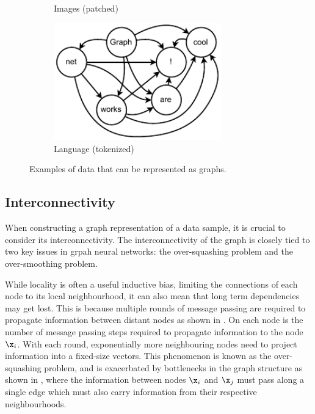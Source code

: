 \begin{figure}
\begin{subfigure}[b]{0.45\textwidth}
        \caption{Images (patched)}
        \label{fig:dog}
    \end{subfigure}
    \begin{subfigure}[b]{0.45\textwidth}
        \centering
        \includegraphics[width=0.8\textwidth]{Figures/transformers/text.pdf}
        \caption{Language (tokenized)}
        \label{fig:text}
    \end{subfigure}
    \caption{Examples of data that can be represented as graphs.}
    \label{fig:graph_examples}
\end{figure}

\subsection{Interconnectivity}

When constructing a graph representation of a data sample, it is crucial to consider its interconnectivity.
The interconnectivity of the graph is closely tied to two key issues in grpah neural networks: the over-squashing problem and the over-smoothing problem.

While locality is often a useful inductive bias, limiting the connections of each node to its local neighbourhood, it can also mean that long term dependencies may get lost.
This is because multiple rounds of message passing are required to propagate information between distant nodes as shown in .
On each node is the number of message passing steps required to propagate information to the node $\x_i$.
With each round, exponentially more neighbouring nodes need to project information into a fixed-size vectors.
This phenomenon is known as the over-squashing problem, and is exacerbated by bottlenecks in the graph structure as shown in , where the information between nodes $\x_i$ and $\x_j$ must pass along a single edge which must also carry information from their respective neighbourhoods.

